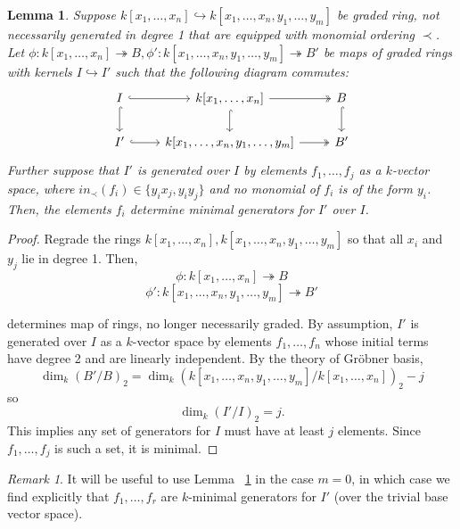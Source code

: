 \documentclass{amsart}
\theoremstyle{plain}
\newtheorem{lem}[thm]{Lemma}
\theoremstyle{definition}
\theoremstyle{remark}
\newtheorem{rem}[thm]{Remark}
\numberwithin{equation}{section}
\begin{document}
\begin{lem}
\label{lem:minimal_quadratic}
Suppose $k[x_1, \ldots, x_n]\hookrightarrow k[x_1, \ldots, x_n, y_1, \ldots, y_m]$ be graded ring, not necessarily
generated in degree 1 that are equipped with monomial ordering $\prec$.
Let $\phi: k[x_1, \ldots, x_n] \twoheadrightarrow B, \phi':k[x_1, \ldots, x_n, y_1, \ldots, y_m]\twoheadrightarrow B'$ be maps of graded
rings with kernels $I \hookrightarrow I'$ such that the following diagram commutes:
\[
	\begin{tikzcd}
	I\ar[hookrightarrow]{r}\ar[hookrightarrow]{d} & k[x_1, \ldots, x_n]\ar[twoheadrightarrow]{r} \ar[hookrightarrow]{d} & B \ar[hookrightarrow]{d}\\
	I' \ar[hookrightarrow]{r} & k[x_1, \ldots, x_n, y_1, \ldots, y_m] \ar[twoheadrightarrow]{r}& B'
	\end{tikzcd}
\]
Further suppose that $I'$ is generated over $I$ by elements $f_1,
\ldots, f_j$ as a $k$-vector space, where $in_\prec(f_i) \in \{y_i x_j, y_i y_j\}$ and no monomial of $f_i$
is of the form $y_i$. Then, the elements $f_i$ determine minimal
generators for $I'$ over $I$.
\end{lem}

\begin{proof}
Regrade the rings $k[x_1, \ldots, x_n], k[x_1, \ldots, x_n, y_1, \ldots, y_m]$ so that all $x_i$ and $y_j$ lie in
degree 1. Then,
\[
	\phi : k[x_1, \ldots, x_n] \twoheadrightarrow B 
\]
\[
	\phi': k[x_1, \ldots, x_n, y_1, \ldots, y_m] \twoheadrightarrow B'
\]


\noindent
determines map of rings, no longer necessarily graded. 
By assumption, $I'$ is generated over $I$ as a $k$-vector space by elements $f_1, \ldots, f_n$ whose initial terms have degree 2 and are linearly independent. By the theory of Gr\"{o}bner basis,
\[
	\dim_k(B'/B)_2=\dim_k(k[x_1, \ldots, x_n, y_1, \ldots, y_m]/k[x_1, \ldots, x_n])_2 - j
\]
so
\[
	\dim_k (I'/I)_2=j.
\]
This implies any set of
generators for $I$ must have at least $j$ elements. Since $f_1,
\ldots, f_j$ is such a set, it is minimal.
\end{proof}


\begin{rem}
\label{rem:minimal_quadratic_trivial_case}
It will be useful to use Lemma ~\ref{lem:minimal_quadratic} in the
case $m= 0$, in which case we find explicitly that $f_1, \ldots, f_r$
are $k$-minimal generators for $I'$ (over the trivial base vector
space). 
\end{rem}
\end{document}
